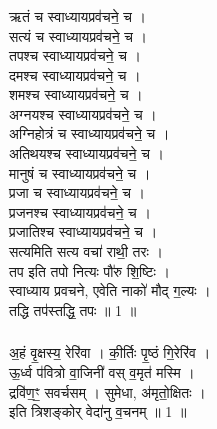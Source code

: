\subsubsection{}
ऋतं च स्वाध्यायप्रव॑चने॒ च ।\\
सत्यं च स्वाध्यायप्रव॑चने॒ च ।\\
तपश्च स्वाध्यायप्रव॑चने॒ च ।\\
दमश्च स्वाध्यायप्रव॑चने॒ च ।\\
शमश्च स्वाध्यायप्रव॑चने॒ च ।\\
अग्नयश्च स्वाध्यायप्रव॑चने॒ च ।\\
अग्निहोत्रं च स्वाध्यायप्रव॑चने॒ च ।\\
अतिथयश्च स्वाध्यायप्रव॑चने॒ च ।\\
मानुषं च स्वाध्यायप्रव॑चने॒ च ।\\
प्रजा च स्वाध्यायप्रव॑चने॒ च ।\\
प्रजनश्च स्वाध्यायप्रव॑चने॒ च ।\\
प्रजातिश्च स्वाध्यायप्रव॑चने॒ च ।\\
सत्यमिति सत्य वचा॑ राथी॒ तरः ।\\
तप इति तपो नित्यः पौ॑रु शि॒ष्टिः ।\\
स्वाध्याय प्रवचने, एवेति नाको॑ मौद् ग॒ल्यः ।\\
तद्धि तप॑स्तद्धि॒ तपः ॥ 1 ॥\\
\subsubsection{}
अ॒हं वृ॒क्षस्य॒ रेरि॑वा । की॒र्तिः पृ॒ष्ठं गि॒रेरि॑व ।\\
ऊ॒र्ध्व प॑वित्रो वा॒जिनी॑ वस् व॒मृत॑ मस्मि ।\\
द्रवि॑ण॒ꣳ॒ सवर्चसम् । सुमेधा, अ॑मृतो॒क्षितः ।\\
इति त्रिशङ्कोर् वेदा॑नु व॒चनम् ॥ 1 ॥\\
